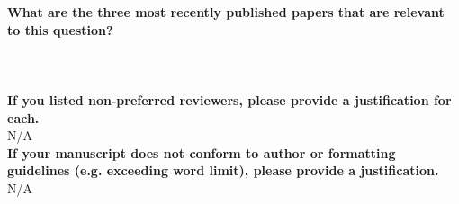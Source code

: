 \documentclass{article}\usepackage[]{graphicx}\usepackage[]{color}
\begin{document}
\noindent \textbf{What are the three most recently published papers that are relevant to this question?} \\

\\
\\ 
\\

\noindent \textbf{ If you listed non-preferred reviewers, please provide a justification for each.} \\

\noindent N/A \\

\noindent \textbf{ If your manuscript does not conform to author or formatting guidelines (e.g. exceeding word limit), please provide a justification.} \\

\noindent N/A \\


\end{document}
